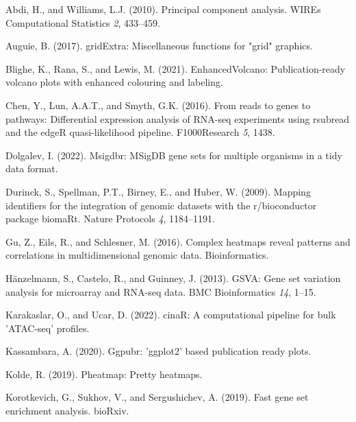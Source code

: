 \documentclass[
  parskip,
  oneside]{scrreprt}
\newlength{\cslhangindent}
\newlength{\cslentryspacingunit} %
\newenvironment{CSLReferences}[2] %
 {%
  \setlength{\parindent}{0pt}
  \ifodd #1
  \let\oldpar\par
  \def\par{\hangindent=\cslhangindent\oldpar}
  \fi
  \setlength{\parskip}{#2\cslentryspacingunit}
 }%
 {}
\begin{document}
\hypertarget{refs}{}
\begin{CSLReferences}{0}{0}
\leavevmode{}%
Abdi, H., and Williams, L.J. (2010). Principal component analysis. WIREs
Computational Statistics \emph{2}, 433--459.

\leavevmode{}%
Auguie, B. (2017). gridExtra: Miscellaneous functions for "grid"
graphics.

\leavevmode{}%
Blighe, K., Rana, S., and Lewis, M. (2021). EnhancedVolcano:
Publication-ready volcano plots with enhanced colouring and labeling.

\leavevmode{}%
Chen, Y., Lun, A.A.T., and Smyth, G.K. (2016). From reads to genes to
pathways: Differential expression analysis of RNA-seq experiments using
rsubread and the edgeR quasi-likelihood pipeline. F1000Research
\emph{5}, 1438.

\leavevmode{}%
Dolgalev, I. (2022). Msigdbr: MSigDB gene sets for multiple organisms in
a tidy data format.

\leavevmode{}%
Durinck, S., Spellman, P.T., Birney, E., and Huber, W. (2009). Mapping
identifiers for the integration of genomic datasets with the
r/bioconductor package biomaRt. Nature Protocols \emph{4}, 1184--1191.

\leavevmode{}%
Gu, Z., Eils, R., and Schlesner, M. (2016). Complex heatmaps reveal
patterns and correlations in multidimensional genomic data.
Bioinformatics.

\leavevmode{}%
Hänzelmann, S., Castelo, R., and Guinney, J. (2013). GSVA: Gene set
variation analysis for microarray and RNA-seq data. BMC Bioinformatics
\emph{14}, 1--15.

\leavevmode{}%
Karakaslar, O., and Ucar, D. (2022). cinaR: A computational pipeline for
bulk 'ATAC-seq' profiles.

\leavevmode{}%
Kassambara, A. (2020). Ggpubr: 'ggplot2' based publication ready plots.

\leavevmode{}%
Kolde, R. (2019). Pheatmap: Pretty heatmaps.

\leavevmode{}%
Korotkevich, G., Sukhov, V., and Sergushichev, A. (2019). Fast gene set
enrichment analysis. bioRxiv.


\end{CSLReferences}
\end{document}
